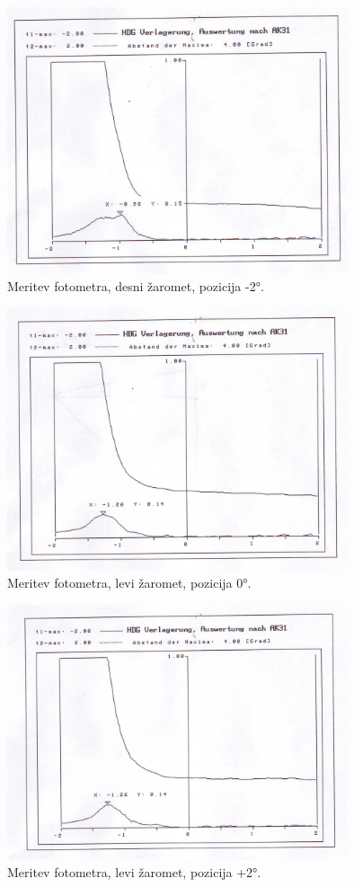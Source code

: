 \documentclass[oneside, a4paper, 12pt]{book}
\begin{document}
\begin{figure}
\begin{center}
\includegraphics[width=10cm]{slike/fotometer-desni--2.jpg}
\end{center}
\caption{Meritev fotometra, desni žaromet, pozicija -2°.}
\label{pic:foto-3}
\end{figure}

\begin{figure}
\begin{center}
\includegraphics[width=10cm]{slike/fotometer-levi-0.jpg}
\end{center}
\caption{Meritev fotometra, levi žaromet, pozicija 0°.}
\label{pic:foto-4}
\end{figure}

\begin{figure}
\begin{center}
\includegraphics[width=10cm]{slike/fotometer-levi-+2.jpg}
\end{center}
\caption{Meritev fotometra, levi žaromet, pozicija +2°.}
\label{pic:foto-5}
\end{figure}
\end{document}
